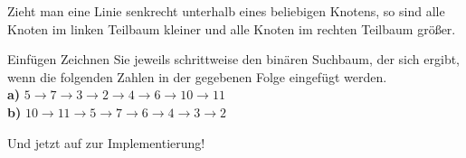 \documentclass{article}
\begin{document}
\begin{itemize}
\begin{center}
          \end{center}
          Zieht man eine Linie senkrecht unterhalb eines beliebigen Knotens, so sind alle Knoten im linken Teilbaum kleiner und alle Knoten im rechten Teilbaum größer.
\end{itemize}

\begin{task}{Einfügen}
Zeichnen Sie jeweils schrittweise den binären Suchbaum, der sich ergibt, wenn die folgenden Zahlen in der gegebenen Folge eingefügt werden. \\
\textbf{a)} $5 \rightarrow 7 \rightarrow 3 \rightarrow 2 \rightarrow 4 \rightarrow 6 \rightarrow 10 \rightarrow 11$ \\
\textbf{b)} $10 \rightarrow 11 \rightarrow 5\rightarrow 7 \rightarrow 6 \rightarrow 4 \rightarrow 3 \rightarrow 2$
\end{task}
Und jetzt auf zur Implementierung!
\end{document}
